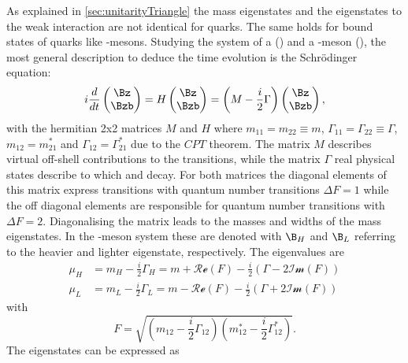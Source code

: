 As explained in \cref{sec:unitarityTriangle} the mass eigenstates and the eigenstates to the weak interaction are not identical for
quarks. The same holds for bound states of quarks like \B-mesons. Studying the system of a \Bz (\bquarkbar\dquark) and a \Bzb-meson
(\bquark\dquarkbar), the most general description to deduce the time evolution is the Schrödinger equation:
\begin{equation}
i\frac{d}{dt}\begin{pmatrix} \Bz \\ \Bzb \end{pmatrix} = H \begin{pmatrix} \Bz \\ \Bzb \end{pmatrix}
=\left(M-\frac{i}{2}\Gamma\right)\begin{pmatrix} \Bz \\ \Bzb \end{pmatrix},
\end{equation}
with the hermitian 2x2 matrices $M$ and $H$ where $m_{11}=m_{22}\equiv m$, $\Gamma_{11}=\Gamma_{22}\equiv\Gamma$, $m_{12}=m_{21}^\ast$ and $\Gamma_{12}=\Gamma_{21}^\ast$ due to the $CPT$ theorem.
The matrix $M$ describes virtual off-shell contributions to the transitions, while the matrix $\Gamma$ real physical states describe to which \Bz and \Bzb decay.
For both matrices the diagonal elements of this matrix express transitions with quantum number transitions $\Delta F=1$ while the off diagonal elements are responsible for quantum number transitions with $\Delta F=2$.
Diagonalising the matrix leads to the masses and widths of the mass eigenstates.
In the \Bz-meson system these are denoted with $\B_H$ and $\B_L$ referring to the heavier and lighter eigenstate, respectively.
The eigenvalues are
\begin{equation}
\begin{split}
\mu_H &= m_H-\frac{i}{2}\Gamma_H = m + \mathcal{Re}\left(F\right)-\frac{i}{2}\left(\Gamma-2\mathcal{Im}\left(F\right)\right)\\
\mu_L &= m_L-\frac{i}{2}\Gamma_L = m - \mathcal{Re}\left(F\right)-\frac{i}{2}\left(\Gamma+2\mathcal{Im}\left(F\right)\right)\label{eq:Mass_eigenvalues}
\end{split}
\end{equation}
with
\begin{equation}
F=\sqrt{\left(m_{12}-\frac{i}{2}\Gamma_{12}\right)\left(m_{12}^\ast-\frac{i}{2}\Gamma_{12}^\ast\right)}.
\end{equation}
The eigenstates can be expressed as
